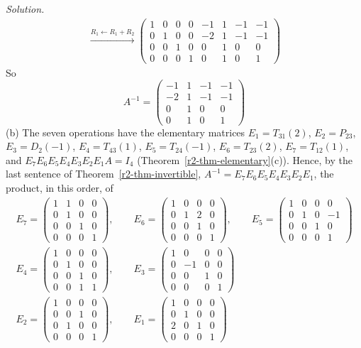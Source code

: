 \documentclass[12pt]{article}
\theoremstyle{definition}
\newenvironment{solution}{\par\noindent\textit{Solution.}\ }{\par\smallskip}
\begin{document}
\begin{solution}
\[\begin{gathered}
\xrightarrow{R_1\leftarrow R_1+R_2}
\left(\begin{array}{cccc|cccc}1&0&0&0&-1&1&-1&-1\\0&1&0&0&-2&1&-1&-1\\0&0&1&0&0&1&0&0\\0&0&0&1&0&1&0&1\end{array}\right)
\end{gathered}
\]
So
\[
A^{-1}=\begin{pmatrix}-1&1&-1&-1\\-2&1&-1&-1\\0&1&0&0\\0&1&0&1\end{pmatrix}
\]
(b) The seven operations have the elementary matrices \(E_1=T_{31}(2)\), \(E_2=P_{23}\), \(E_3=D_2(-1)\),
\(E_4=T_{43}(1)\), \(E_5=T_{24}(-1)\), \(E_6=T_{23}(2)\), \(E_7=T_{12}(1)\), and \(E_7E_6E_5E_4E_3E_2E_1A=I_4\)
(Theorem~\ref{r2-thm-elementary}(c)). Hence, by the last sentence of Theorem~\ref{r2-thm-invertible},
\(A^{-1}=E_7E_6E_5E_4E_3E_2E_1\), the product, in this order, of
\[
\begin{gathered}
E_7=\begin{pmatrix}1&1&0&0\\0&1&0&0\\0&0&1&0\\0&0&0&1\end{pmatrix},\qquad E_6=\begin{pmatrix}1&0&0&0\\0&1&2&0\\0&0&1&0\\0&0&0&1\end{pmatrix},\qquad E_5=\begin{pmatrix}1&0&0&0\\0&1&0&-1\\0&0&1&0\\0&0&0&1\end{pmatrix}\\
E_4=\begin{pmatrix}1&0&0&0\\0&1&0&0\\0&0&1&0\\0&0&1&1\end{pmatrix},\qquad E_3=\begin{pmatrix}1&0&0&0\\0&-1&0&0\\0&0&1&0\\0&0&0&1\end{pmatrix}\\
E_2=\begin{pmatrix}1&0&0&0\\0&0&1&0\\0&1&0&0\\0&0&0&1\end{pmatrix},\qquad E_1=\begin{pmatrix}1&0&0&0\\0&1&0&0\\2&0&1&0\\0&0&0&1\end{pmatrix}

\end{gathered}\]
\end{solution}
\end{document}
